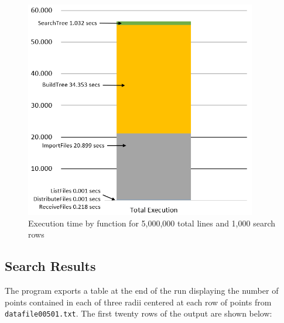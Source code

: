 \begin{figure}
\includegraphics[width=0.9\textwidth]{./images/Runtime3.png}
\caption{Execution time by function for 5,000,000 total lines and 1,000 search rows}
\end{figure}


%
%

\subsection{Search Results}

The program exports a table at the end of the run displaying the number of points contained in each of three radii centered at each row of points from  \texttt{datafile00501.txt}. The first twenty rows of the output are shown below:

